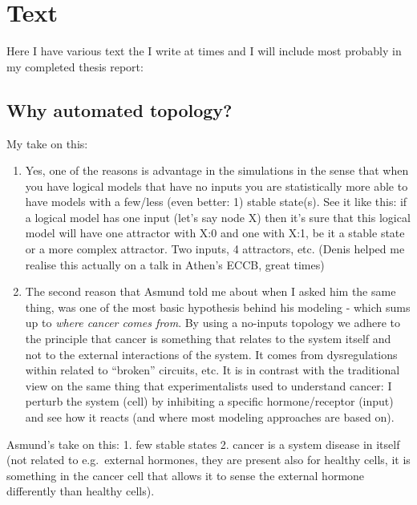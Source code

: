 \documentclass[
  12pt,
]{book}
\providecommand{\tightlist}{%
  \setlength{\itemsep}{0pt}\setlength{\parskip}{0pt}}
\begin{document}
\hypertarget{text}{%
\chapter{Text}\label{text}}

Here I have various text the I write at times and I will include most probably in my completed thesis report:

\hypertarget{why-automated-topology}{%
\section{Why automated topology?}\label{why-automated-topology}}

My take on this:

\begin{enumerate}
\def\labelenumi{\arabic{enumi}.}
\tightlist
\item
  Yes, one of the reasons is advantage in the simulations in the sense that when you have logical models that have no inputs you are statistically more able to have models with a few/less (even better: 1) stable state(s).
  See it like this: if a logical model has one input (let's say node X) then it's sure that this logical model will have one attractor with X:0 and one with X:1, be it a stable state or a more complex attractor.
  Two inputs, 4 attractors, etc. (Denis helped me realise this actually on a talk in Athen's ECCB, great times)
\item
  The second reason that Asmund told me about when I asked him the same thing, was one of the most basic hypothesis behind his modeling - which sums up to \emph{where cancer comes from}.
  By using a no-inputs topology we adhere to the principle that cancer is something that relates to the system itself and not to the external interactions of the system.
  It comes from dysregulations within related to ``broken'' circuits, etc.
  It is in contrast with the traditional view on the same thing that experimentalists used to understand cancer: I perturb the system (cell) by inhibiting a specific hormone/receptor (input) and see how it reacts (and where most modeling approaches are based on).
\end{enumerate}

Asmund's take on this:
1. few stable states
2. cancer is a system disease in itself (not related to e.g.~external hormones, they are present also for healthy cells, it is something in the cancer cell that allows it to sense the external hormone differently than healthy cells).
\end{document}
